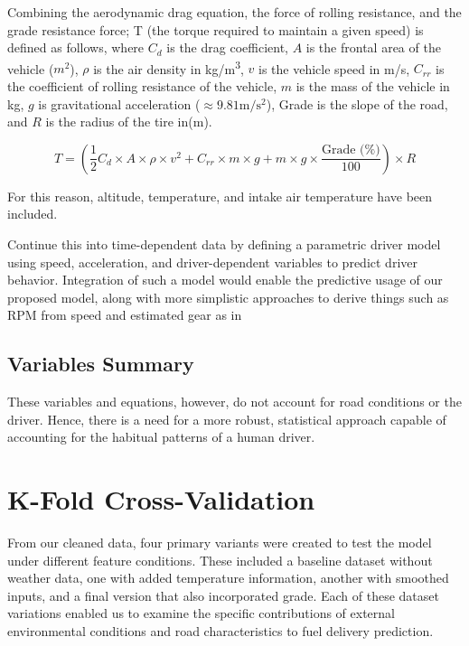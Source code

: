 \documentclass[letterpaper]{article}
\begin{document}
Combining the aerodynamic drag equation, the force of rolling resistance, 
and the grade resistance force; T (the torque required to maintain a given 
speed) is defined as follows, where $C_d$ is the 
drag coefficient, $A$ is the frontal area of the vehicle ($m^2$), $\rho$ 
is the air density in kg/m\textsuperscript{3}, $v$ is the vehicle speed 
in m/s, $C_{rr}$ is the coefficient of rolling resistance of the vehicle, 
$m$ is the mass of the vehicle in kg, $g$ is gravitational acceleration 
($\approx 9.81 \mathrm{m}/\mathrm{s}^2$), Grade is the slope of the road, 
and $R$ is the radius of the tire in(m).

\[
T = (\frac{1}{2}C_d\times A \times \rho \times v^2 + C_{rr} \times m \times g + m \times g \times \frac{\text{Grade (\%)}}{100})\times R
\]

For this reason, altitude, temperature, and intake air temperature have 
been included. 

\cite{hegde2021real} Continue this into time-dependent data by defining a
parametric driver model using speed, acceleration, and driver-dependent
variables to predict driver behavior. Integration of such a model would
enable the predictive usage of our proposed model, along with more 
simplistic approaches to derive things such as RPM from speed and 
estimated gear as in \cite{rykala2023modeling}

\subsection*{Variables Summary}

These variables and equations, however, do not account for road conditions 
or the driver. Hence, there is a need for a more robust, statistical 
approach capable of accounting for the habitual patterns of a human driver.

\section*{K-Fold Cross-Validation}

From our cleaned data, four primary variants were created to test the model 
under different feature conditions. These included a baseline dataset 
without weather data, one with added temperature information, another with 
smoothed inputs, and a final version that also incorporated grade. Each of 
these dataset variations enabled us to examine the specific contributions 
of external environmental conditions and road characteristics to fuel 
delivery prediction.
\end{document}
